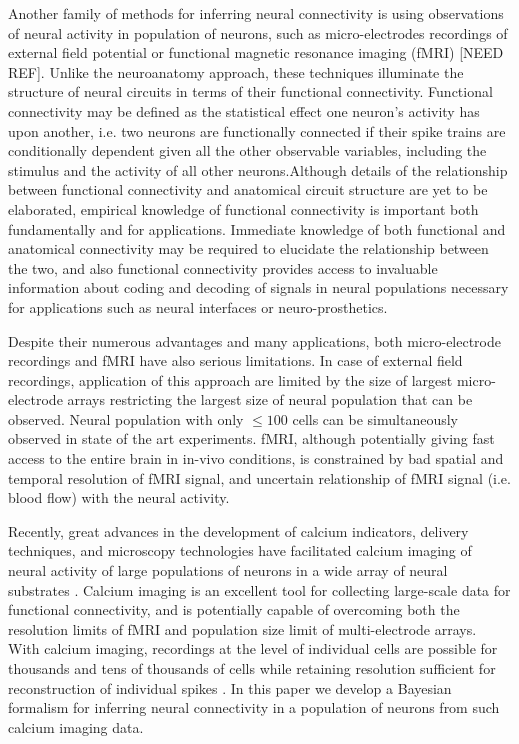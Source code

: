 Another family of methods for inferring neural connectivity is using observations of neural activity in population of neurons, such as micro-electrodes recordings of external field potential \cite{Meister1994, Litke2003, Litke2004, PILL07, Stevenson2008} or functional magnetic resonance imaging (fMRI) [NEED REF]. Unlike the neuroanatomy approach, these techniques illuminate the structure of neural circuits in terms of their functional connectivity. Functional connectivity may be defined as the statistical effect one neuron's activity has upon another, i.e. two neurons are functionally connected if their spike trains are conditionally dependent given all the other observable variables, including the stimulus and the activity of all other neurons.Although details of the relationship between functional connectivity and anatomical circuit structure are yet to be elaborated, empirical knowledge of functional connectivity is important both fundamentally and for applications. Immediate knowledge of both functional and anatomical connectivity may be required to elucidate the relationship between the two, and also functional connectivity provides access to invaluable information about coding and decoding of signals in neural populations necessary for applications such as neural interfaces or neuro-prosthetics.

Despite their numerous advantages and many applications, both micro-electrode recordings and fMRI have also serious limitations. In case of external field recordings, application of this approach are limited by the size of largest micro-electrode arrays restricting the largest size of neural population that can be observed. Neural population with only $\leq 100$ cells can be simultaneously observed in state of the art experiments. fMRI, although potentially giving fast access to the entire brain in in-vivo conditions, is constrained by bad spatial and temporal resolution of fMRI signal, and uncertain relationship of fMRI signal (i.e. blood flow) with the neural activity.

Recently, great advances in the development of calcium indicators, delivery techniques, and microscopy technologies have facilitated calcium imaging of neural activity of large populations of neurons in a wide array of neural substrates \cite{Ikegaya2005, Nagayama2007, Nevian2007, Gobel07b}. Calcium imaging is an excellent tool for collecting large-scale data for functional connectivity, and is potentially capable of overcoming both the resolution limits of fMRI and population size limit of multi-electrode arrays. With calcium imaging, recordings at the level of individual cells are possible for thousands and tens of thousands of cells while retaining resolution sufficient for reconstruction of individual spikes \cite{Ikegaya2005}. In this paper we develop a Bayesian formalism for inferring neural connectivity in a population of neurons from such calcium imaging data.
